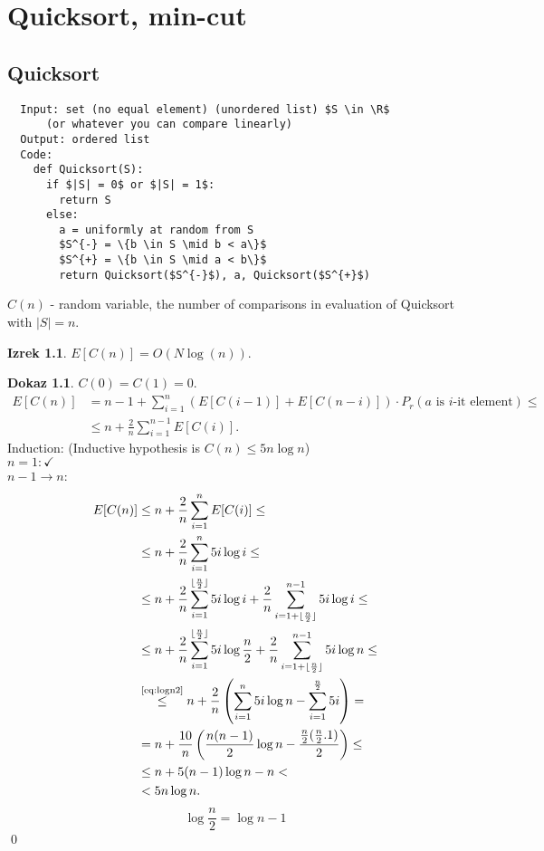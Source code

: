 \documentclass[a4paper, 12pt]{book}
\theoremstyle{definition}
\newtheorem{theorem}[counter]{Izrek}
\newtheorem{pro}[counter]{Dokaz}
\theoremstyle{remark}
\newcommand{\R}{\mathbb{R}}
\begin{document}
\chapter{Quicksort, min-cut}


\section{Quicksort}

\begin{lstlisting}
  Input: set (no equal element) (unordered list) $S \in \R$
      (or whatever you can compare linearly)
  Output: ordered list
  Code:
    def Quicksort(S):
      if $|S| = 0$ or $|S| = 1$:
        return S
      else:
        a = uniformly at random from S
        $S^{-} = \{b \in S \mid b < a\}$
        $S^{+} = \{b \in S \mid a < b\}$
        return Quicksort($S^{-}$), a, Quicksort($S^{+}$)
\end{lstlisting}
$C(n)$ - random variable, the number of comparisons in evaluation of Quicksort with $|S| = n$.
\begin{theorem}
  $E[C(n)] = O\left(N \log(n)\right)$.
\end{theorem}
\begin{pro}
  $C(0) = C(1) = 0$. \\
  \begin{align*}
    E[C(n)] &= n - 1 + \sum_{i=1}^{n} \left(E[C(i-1)] + E[C(n-i)]\right) \cdot P_r(a \text{ is $i$-it element}) \leq \\
    &\leq n + \frac{2}{n} \sum_{i=1}^{n-1} E[C(i)].
  \end{align*}
  Induction: (Inductive hypothesis is $C(n) \leq 5n\log{n}$)\\
  $n = 1: \checkmark$ \\
  $n-1 \to n$:
  \begin{align*}
    E[C(n)] &\leq n + \frac{2}{n} \sum_{i=1}^{n} E[C(i)] \leq \\
    &\leq n + \frac{2}{n} \sum_{i=1}^{n} 5i \log i \leq \\
    &\leq n + \frac{2}{n} \sum_{i=1}^{\lfloor\frac{n}{2}\rfloor} 5i \log i +
      \frac{2}{n} \sum_{i=1+\lfloor\frac{n}{2}\rfloor}^{n-1} 5i \log i \leq \\
    &\leq n + \frac{2}{n} \sum_{i=1}^{\lfloor\frac{n}{2}\rfloor} 5i \log \frac{n}{2} +
      \frac{2}{n} \sum_{i=1+\lfloor\frac{n}{2}\rfloor}^{n-1} 5i \log n \leq \\
    &\stackrel{\refeq{eq:logn2}}{\leq} n + \frac{2}{n} \left(\sum_{i=1}^n 5i \log n - \sum_{i=1}^{\frac{n}{2}} 5i\right) = \\
    &= n + \frac{10}{n} \left(\frac{n(n-1)}{2} \log n - \frac{\frac{n}{2} (\frac{n}{2} . 1)}{2}\right) \leq \\
    &\leq n + 5(n-1) \log n - n < \\
    &< 5n \log n.
  \end{align*}
  \begin{equation}
    \label{eq:logn2}
    \log \frac{n}{2} = \log n - 1
  \end{equation}
  \qed
\end{pro}
\end{document}
